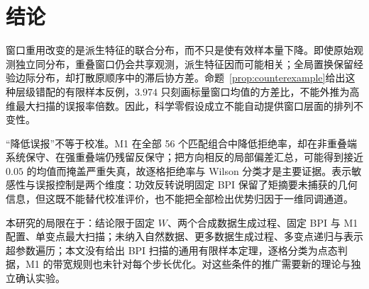 \section{结论}\label{sec:discussion}

窗口重用改变的是派生特征的联合分布，而不只是使有效样本量下降。即使原始观测独立同分布，重叠窗口仍会共享观测，派生特征因而可能相关；全局置换保留经验边际分布，却打散原顺序中的滞后协方差。命题~\ref{prop:counterexample}给出这种层级错配的有限样本反例，$3.974$ 只刻画标量窗口均值的方差比，不能外推为高维最大扫描的误报率倍数。因此，科学零假设成立不能自动提供窗口层面的排列不变性。

“降低误报”不等于校准。M1 在全部 56 个匹配组合中降低拒绝率，却在非重叠端系统保守、在强重叠端仍残留反保守；把方向相反的局部偏差汇总，可能得到接近 $0.05$ 的均值而掩盖严重失真，故逐格拒绝率与 Wilson 分类才是主要证据。表示敏感性与误报控制是两个维度：功效反转说明固定 BPI 保留了矩摘要未捕获的几何信息，但这既不能替代校准评价，也不能把全部检出优势归因于一维同调通道。

本研究的局限在于：结论限于固定 $W$、两个合成数据生成过程、固定 BPI 与 M1 配置、单变点最大扫描；未纳入自然数据、更多数据生成过程、多变点递归与表示超参数遍历；本文没有给出 BPI 扫描的通用有限样本定理，逐格分类为点态判据，M1 的带宽规则也未针对每个步长优化。对这些条件的推广需要新的理论与独立确认实验。
